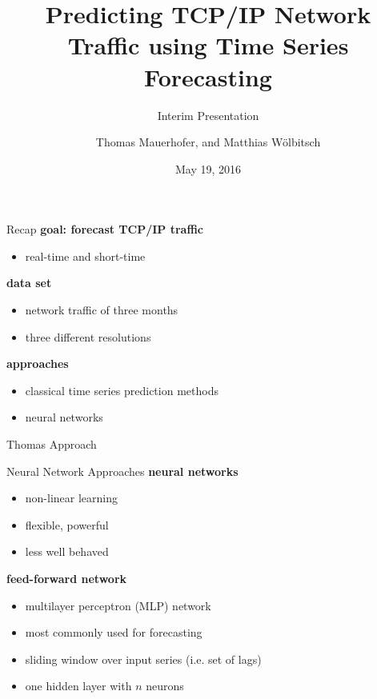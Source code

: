 \documentclass{beamer}
\title{Predicting TCP/IP Network Traffic using Time Series Forecasting}
\subtitle{Interim Presentation}
\date{May 19, 2016}
\author{Thomas Mauerhofer, and Matthias Wölbitsch}
\begin{document}
  \maketitle
  
  \begin{frame}{Recap}   
    \textbf{goal: forecast TCP/IP traffic}
    \begin{itemize}
     \item real-time and short-time
    \end{itemize}
    
    \textbf{data set}
    \begin{itemize}
     \item network traffic of three months
     \item three different resolutions
    \end{itemize}
    
    \textbf{approaches}
    \begin{itemize}
     \item classical time series prediction methods
     \item neural networks
    \end{itemize}
  \end{frame}
 
 
  \begin{frame}{Thomas Approach}
   
  \end{frame}

  
  \begin{frame}{Neural Network Approaches}
    \textbf{neural networks}
    \begin{itemize}
     \item non-linear learning
     \item flexible, powerful
     \item less well behaved
    \end{itemize}
    
    \textbf{feed-forward network}
    \begin{itemize}
     \item multilayer perceptron (MLP) network 
     \item most commonly used for forecasting
     \item sliding window over input series (i.e. set of lags)
     \item one hidden layer with \(n\) neurons
    \end{itemize}
  \end{frame}
\end{document}

